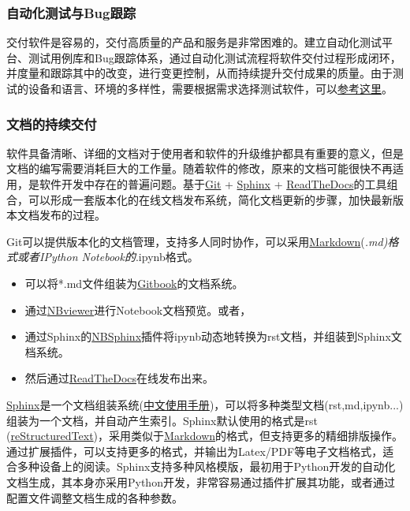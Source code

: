 \documentclass[letterpaper,10pt,english]{sphinxmanual}
\begin{document}
\subsubsection{自动化测试与Bug跟踪}
\label{gispark_paas:_u81ea_u52a8_u5316_u6d4b_u8bd5_u4e0eBug_u8ddf_u8e2a}
交付软件是容易的，交付高质量的产品和服务是非常困难的。建立自动化测试平台、测试用例库和Bug跟踪体系，通过自动化测试流程将软件交付过程形成闭环，并度量和跟踪其中的改变，进行变更控制，从而持续提升交付成果的质量。由于测试的设备和语言、环境的多样性，需要根据需求选择测试软件，可以\href{http://www.oschina.net/search?scope=project\&q=\%E8\%87\%AA\%E5\%8A\%A8\%E5\%8C\%96\%E6\%B5\%8B\%E8\%AF\%95}{参考这里}。


\subsubsection{文档的持续交付}
\label{gispark_paas:_u6587_u6863_u7684_u6301_u7eed_u4ea4_u4ed8}
软件具备清晰、详细的文档对于使用者和软件的升级维护都具有重要的意义，但是文档的编写需要消耗巨大的工作量。随着软件的修改，原来的文档可能很快不再适用，是软件开发中存在的普遍问题。基于\href{https://git-scm.com/}{Git}
+ \href{http://www.sphinx-doc.org}{Sphinx} +
\href{http://www.ReadTheDocs.org}{ReadTheDocs}的工具组合，可以形成一套版本化的在线文档发布系统，简化文档更新的步骤，加快最新版本文档发布的过程。

Git可以提供版本化的文档管理，支持多人同时协作，可以采用\href{http://my.oschina.net/u/2306127/blog/655706}{Markdown}(\emph{.md)格式或者IPython
Notebook的}.ipynb格式。
\begin{itemize}
\item {} 
可以将*.md文件组装为\href{https://www.gitbook.com/}{Gitbook}的文档系统。

\item {} 
通过\href{http://nbviewer.jupyter.org/}{NBviewer}进行Notebook文档预览。或者，

\item {} 
通过Sphinx的\href{http://nbsphinx.readthedocs.io}{NBSphinx}插件将ipynb动态地转换为rst文档，并组装到Sphinx文档系统。

\item {} 
然后通过\href{http://www.ReadTheDocs.org}{ReadTheDocs}在线发布出来。

\end{itemize}

\href{http://www.sphinx-doc.org}{Sphinx}是一个文档组装系统(\href{http://zh-sphinx-doc.readthedocs.io/en/latest/tutorial.html}{中文使用手册})，可以将多种类型文档(rst,md,ipynb...)组装为一个文档，并自动产生索引。Sphinx默认使用的格式是rst
(\href{http://docutils.sourceforge.net/rst.html}{reStructuredText})，采用类似于\href{http://my.oschina.net/u/2306127/blog/655706}{Markdown}的格式，但支持更多的精细排版操作。通过扩展插件，可以支持更多的格式，并输出为Latex/PDF等电子文档格式，适合多种设备上的阅读。Sphinx支持多种风格模版，最初用于Python开发的自动化文档生成，其本身亦采用Python开发，非常容易通过插件扩展其功能，或者通过配置文件调整文档生成的各种参数。
\end{document}
